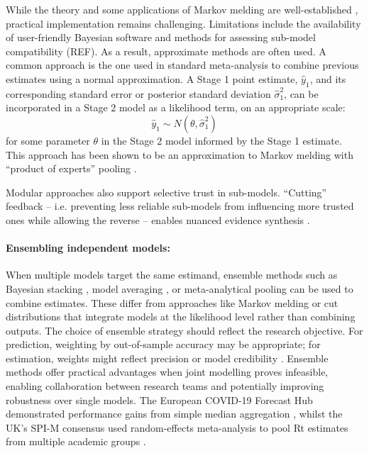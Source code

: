 \documentclass{article}
\begin{document}
While the theory and some applications of Markov melding are well-established \citep{goudie2019joining,nicholson2022interoperability,manderson2023combining}, practical implementation remains challenging. Limitations include the availability of user-friendly Bayesian software and methods for assessing sub-model compatibility (REF). As a result, approximate methods are often used. A common approach is the one used in standard meta-analysis \citep{borenstein2021introduction} to combine previous estimates using a normal approximation. A Stage 1 point estimate, $\hat{y}_1$, and its corresponding standard error or posterior standard deviation $\hat{\sigma}^2_1$, can be incorporated in a Stage 2 model as a likelihood term, on an appropriate scale:
$$
\hat{y}_1 \sim N(\theta, \hat{\sigma}^2_1)
$$ for some parameter $\theta$ in the Stage 2 model informed by the Stage 1 estimate. This approach has been shown to be an approximation to Markov melding with ``product of experts'' pooling \citep{goudie2019joining}.

Modular approaches also support selective trust in sub-models. ``Cutting'' feedback -- i.e. preventing less reliable sub-models from influencing more trusted ones while allowing the reverse -- enables nuanced evidence synthesis \citep{plummer2015cuts,carmona2022scalable,yu2023variational,liu2025general}.

\paragraph{Ensembling independent models:} When multiple models target the same estimand, ensemble methods such as Bayesian stacking \citep{yao2018using}, model averaging \citep{hoeting1999bayesian}, or meta-analytical pooling \citep{jackson2011multivariate} can be used to combine estimates.
These differ from approaches like Markov melding or cut distributions that integrate models at the likelihood level rather than combining outputs.
The choice of ensemble strategy should reflect the research objective.
For prediction, weighting by out-of-sample accuracy may be appropriate; for estimation, weights might reflect precision or model credibility \citep{yao2018using}.
Ensemble methods offer practical advantages when joint modelling proves infeasible, enabling collaboration between research teams and potentially improving robustness over single models.
The European COVID-19 Forecast Hub demonstrated performance gains from simple median aggregation \citep{sherratt2021exploring}, whilst the UK's SPI-M consensus used random-effects meta-analysis to pool Rt estimates from multiple academic groups \citep{manley2024combining}.
\end{document}
